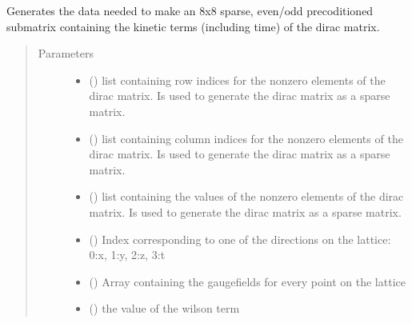 \documentclass[letterpaper,10pt,english]{sphinxmanual}
\begin{document}
\begin{fulllineitems}
\label{\detokenize{index:su2.initDeo}}
Generates the data needed to make an 8x8 sparse, even/odd
precoditioned submatrix containing the kinetic terms (including
time) of the dirac matrix.
\begin{quote}\begin{description}
\item[{Parameters}] \leavevmode\begin{itemize}
\item {} 
 () \textendash{} list containing row indices for the non\sphinxhyphen{}zero elements of the
dirac matrix. Is used to generate the dirac matrix as a sparse
matrix.

\item {} 
 () \textendash{} list containing column indices for the non\sphinxhyphen{}zero elements of the
dirac matrix. Is used to generate the dirac matrix as a sparse
matrix.

\item {} 
 () \textendash{} list containing the values of the non\sphinxhyphen{}zero elements of the
dirac matrix. Is used to generate the dirac matrix as a sparse
matrix.

\item {} 
 () \textendash{} Index corresponding to one of the directions on the lattice:
0:x, 1:y, 2:z, 3:t

\item {} 
 () \textendash{} Array containing the gaugefields for every point on the lattice

\item {} 
 () \textendash{} the value of the wilson term


\end{itemize}
\end{description}
\end{quote}
\end{fulllineitems}
\end{document}
